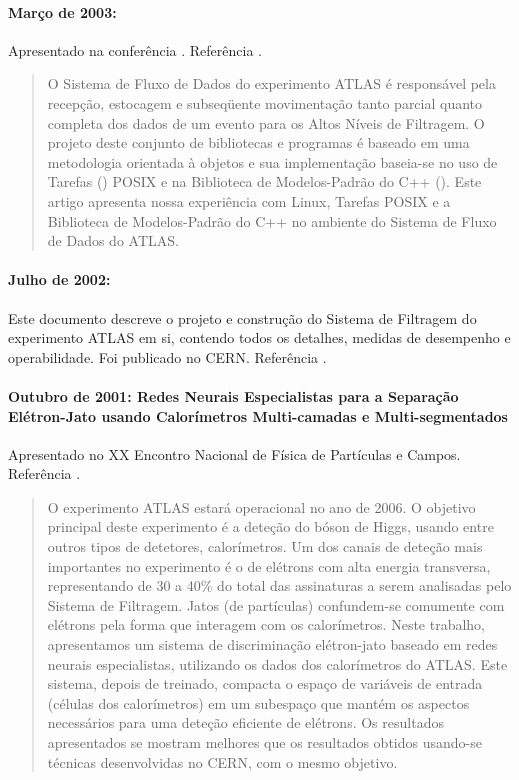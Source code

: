\paragraph{Março de 2003: } Apresentado na conferência
. Referência \cite{aa:chep-2003}.

\begin{quotation}
O Sistema de Fluxo de Dados do experimento ATLAS é responsável pela recepção,
estocagem e subseqüente movimentação tanto parcial quanto completa dos dados
de um evento para os Altos Níveis de Filtragem. O projeto deste conjunto de
bibliotecas e programas é baseado em uma metodologia orientada à objetos e sua
implementação baseia-se no uso de Tarefas () POSIX e na
Biblioteca de Modelos-Padrão do C++ (). Este
artigo apresenta nossa experiência com Linux, Tarefas POSIX e a Biblioteca de
Modelos-Padrão do C++ no ambiente  do Sistema de Fluxo de Dados do
ATLAS.
\end{quotation}

\paragraph{Julho de 2002: } Este documento descreve o
projeto e construção do Sistema de Filtragem do experimento ATLAS em si,
contendo todos os detalhes, medidas de desempenho e operabilidade. Foi
publicado no CERN. Referência \cite{hlt-tdr}.

\paragraph{Outubro de 2001: Redes Neurais Especialistas para a Separação
Elétron-Jato usando Calorímetros Multi-camadas e Multi-segmentados}
Apresentado no XX Encontro Nacional de Física de Partículas e
Campos. Referência \cite{aa:enfpc-01}.

\begin{quotation}
O experimento ATLAS estará operacional no ano de 2006. O objetivo principal
deste experimento é a deteção do bóson de Higgs, usando entre outros tipos de
detetores, calorímetros. Um dos canais de deteção mais importantes no
experimento é o de elétrons com alta energia transversa, representando de 30 a
40\% do total das assinaturas a serem analisadas pelo Sistema de
Filtragem. Jatos (de partículas) confundem-se comumente com elétrons pela
forma que interagem com os calorímetros. Neste trabalho, apresentamos um
sistema de discriminação elétron-jato baseado em redes neurais especialistas,
utilizando os dados dos calorímetros do ATLAS. Este sistema, depois de
treinado, compacta o espaço de variáveis de entrada (células dos calorímetros)
em um subespaço que mantém os aspectos necessários para uma deteção eficiente
de elétrons. Os resultados apresentados se mostram melhores que os resultados
obtidos usando-se técnicas desenvolvidas no CERN, com o mesmo objetivo.
\end{quotation}

